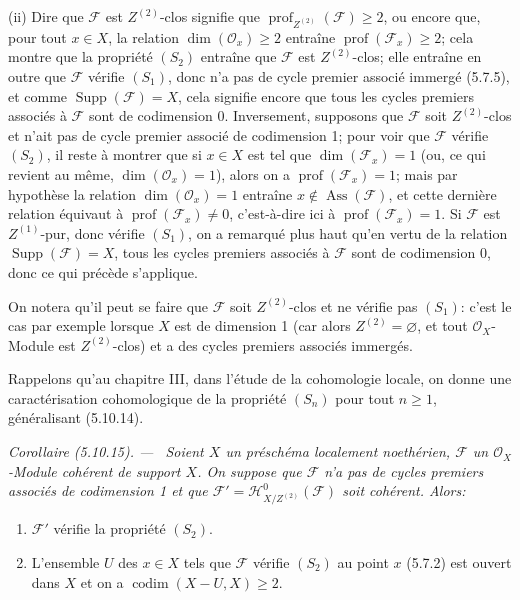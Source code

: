 \documentclass[10pt,oneside]{book}
\newcommand{\oldpage}[2][]{%
  \setcounter{footnote}{0}%
  \marginpar{\scriptsize\textbf{#1}~|~#2}\ignorespaces}
\newenvironment{corollary}[1][]{%
  \par\medskip\noindent\itshape Corollaire (#1). ---\ }{\par}
\begin{document}
(ii) Dire que $\mathcal F$ est $Z^{(2)}$-clos signifie que
$\operatorname{prof}_{Z^{(2)}}(\mathcal F)\geq2$, ou encore que, pour tout
$x\in X$, la relation $\dim(\mathcal O_x)\geq2$ entraîne
$\operatorname{prof}(\mathcal F_x)\geq2$; cela montre que la propriété $(S_2)$
entraîne que $\mathcal F$ est $Z^{(2)}$-clos; elle entraîne en outre que
$\mathcal F$ vérifie $(S_1)$, donc n'a pas de cycle premier associé immergé
(5.7.5), et comme $\operatorname{Supp}(\mathcal F)=X$, cela signifie encore
que tous les cycles premiers associés à $\mathcal F$ sont de codimension 0.
Inversement, supposons que $\mathcal F$ soit $Z^{(2)}$-clos et n'ait pas de
cycle premier associé de codimension 1; pour voir que $\mathcal F$ vérifie
$(S_2)$, il reste à montrer que si $x\in X$ est tel que
$\dim(\mathcal F_x)=1$ (ou, ce qui revient au même,
$\dim(\mathcal O_x)=1$), alors on a $\operatorname{prof}(\mathcal F_x)=1$;
mais par hypothèse la relation $\dim(\mathcal O_x)=1$ entraîne
$x\notin\operatorname{Ass}(\mathcal F)$, et cette dernière relation équivaut à
$\operatorname{prof}(\mathcal F_x)\neq0$, c'est-à-dire ici à
$\operatorname{prof}(\mathcal F_x)=1$. Si $\mathcal F$ est $Z^{(1)}$-pur,
donc vérifie $(S_1)$, on a remarqué plus haut qu'en vertu de la relation
$\operatorname{Supp}(\mathcal F)=X$, tous les cycles premiers associés à
$\mathcal F$ sont de codimension 0, donc ce qui précède s'applique.

On notera qu'il peut se faire que $\mathcal F$ soit $Z^{(2)}$-clos et ne
vérifie pas $(S_1)$: c'est le cas par exemple lorsque $X$ est de dimension 1
(car alors $Z^{(2)}=\varnothing$, et tout $\mathcal O_X$-Module est
$Z^{(2)}$-clos) et a des cycles premiers associés immergés.

Rappelons qu'au chapitre III, dans l'étude de la cohomologie locale, on donne
une caractérisation cohomologique de la propriété $(S_n)$ pour tout $n\geq1$,
généralisant (5.10.14).

\begin{corollary}[5.10.15]
\label{IV.2.s5.10.15-fr}
Soient $X$ un préschéma localement noethérien, $\mathcal F$ un
$\mathcal O_X$-Module cohérent de support $X$. On suppose que $\mathcal F$
n'a pas de cycles premiers associés de codimension 1 et que
$\mathcal F'=\mathcal H^0_{X/Z^{(2)}}(\mathcal F)$ soit cohérent. Alors:
\begin{enumerate}
\item[(i)] $\mathcal F'$ vérifie la propriété $(S_2)$.

\oldpage[IV-2]{120}

\item[(ii)] L'ensemble $U$ des $x\in X$ tels que $\mathcal F$ vérifie $(S_2)$
au point $x$ (5.7.2) est ouvert dans $X$ et on a
$\operatorname{codim}(X-U,X)\geq2$.
\end{enumerate}
\end{corollary}
\end{document}
